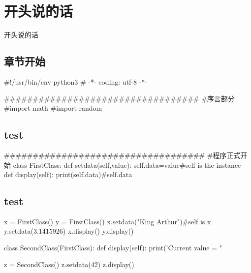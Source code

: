 \documentclass[11pt,oneside]{book}
\begin{document}
\frontmatter

\author{作者}
\titleLC

\chapter*{开头说的话}
\begin{common-format}
开头说的话


\end{common-format}


\setcounter{tocdepth}{2}
\tableofcontents

\begin{common-format}
\mainmatter

\chapter{章节开始}

\begin{python}
#!/usr/bin/env python3
# -*- coding: utf-8 -*-

##################################
#序言部分
#import math
#import random
\end{python}

\section{test}
\begin{python}
###################################
#程序正式开始
class FirstClass:
    def setdata(self,value):
        self.data=value#self is the instance
    def display(self):
        print(self.data)#self.data
\end{python}


\section{test}
\begin{python}

x = FirstClass()
y = FirstClass()
x.setdata("King Arthur")#self is x
y.setdata(3.1415926)
x.display()
y.display()

class SecondClass(FirstClass):
    def display(self):
        print('Current value = "%

z = SecondClass()
z.setdata(42)
z.display()


\end{python}
\end{common-format}
\end{document}
